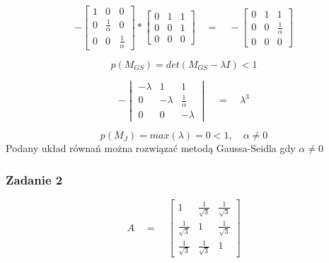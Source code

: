 \documentclass[a4paper]{article}
\begin{document}
$$ -
\begin{bmatrix}
1 & 0 & 0 \\
 0 & \frac{1}{\alpha} & 0 \\
 0 &  0 & \frac{1}{\alpha}
\end{bmatrix}
*
\begin{bmatrix}
0 & 1 & 1 \\
0 & 0 &  1 \\
 0 &  0 & 0
\end{bmatrix}
\quad = \quad -
\begin{bmatrix}
0 & 1 & 1 \\
0 & 0 &  \frac{1}{\alpha} \\
 0 &  0 & 0
\end{bmatrix}
$$


$$ p(M_{GS}) = det(M_{GS} - \lambda I)<1$$

$$ -
\begin{vmatrix}
-\lambda & 1 &  1 \\
 0 & -\lambda &  \frac{1}{\alpha} \\
 0 &  0 & -\lambda
\end{vmatrix}
\quad = \quad \lambda^3
$$

$$ p(M_J) = max(\lambda) =0  <1,
\quad \alpha \neq 0 $$
Podany układ równań można rozwiązać metodą Gaussa-Seidla gdy $\alpha \neq 0 $
\subsubsection{Zadanie 2} 
$$A \quad = \quad 
\begin{bmatrix}
1 & \frac{1}{\sqrt{3}} &  \frac{1}{\sqrt{3}} \\
 \frac{1}{\sqrt{3}} & 1 &  \frac{1}{\sqrt{3}} \\
 \frac{1}{\sqrt{3}} &  \frac{1}{\sqrt{3}} & 1
\end{bmatrix}
$$
\end{document}
